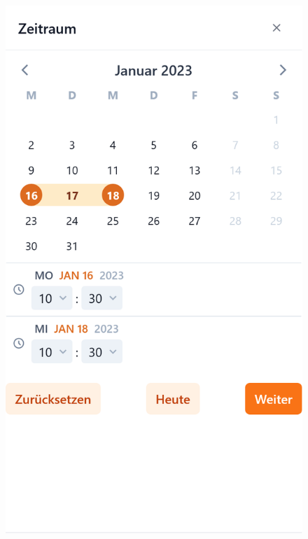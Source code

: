 \begin{figure}[p]
    \centering
    \includegraphics[scale=0.19]{Bilder/Dialgobeispiel/Datum eingeben.png}

\end{figure}
